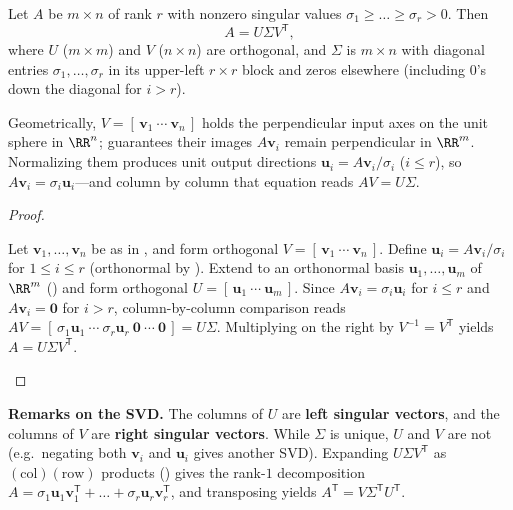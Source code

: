 \documentclass[10pt]{scrartcl}
\newcommand{\vv}[1]{\mathbf{#1}}
\begin{document}
\begin{theorem*}
  Let $A$ be $m\times n$ of rank $r$ with nonzero singular values $\sigma_1\ge\dots\ge\sigma_r>0$. Then
  \[
    A = U\Sigma V^{\mathsf T},
  \]
  where $U$ ($m\times m$) and $V$ ($n\times n$) are orthogonal, and $\Sigma$ is $m\times n$ with diagonal entries $\sigma_1,\dots,\sigma_r$ in its upper-left $r\times r$ block and zeros elsewhere (including $0$'s down the diagonal for $i>r$).
\end{theorem*}
\begin{ideabox}
  Geometrically, $V=[\,\vv v_1\ \cdots\ \vv v_n\,]$ holds the perpendicular input axes on the unit sphere in $\RR^n$;  guarantees their images $A\vv v_i$ remain perpendicular in $\RR^m$. Normalizing them produces unit output directions $\vv u_i=A\vv v_i/\sigma_i$ ($i\le r$), so $A\vv v_i=\sigma_i\vv u_i$---and column by column that equation reads $AV=U\Sigma$.
\end{ideabox}
\begin{proof}
  \begin{steps}
    \ii Let $\vv v_1,\dots,\vv v_n$ be as in , and form orthogonal $V=[\,\vv v_1\ \cdots\ \vv v_n\,]$.
    \ii Define $\vv u_i=A\vv v_i/\sigma_i$ for $1\le i\le r$ (orthonormal by ). Extend to an orthonormal basis $\vv u_1,\dots,\vv u_m$ of $\RR^m$ () and form orthogonal $U=[\,\vv u_1\ \cdots\ \vv u_m\,]$.
    \ii Since $A\vv v_i=\sigma_i\vv u_i$ for $i\le r$ and $A\vv v_i=\vv 0$ for $i>r$, column-by-column comparison reads $AV=[\,\sigma_1\vv u_1\ \cdots\ \sigma_r\vv u_r\ \vv 0\ \cdots\ \vv 0\,]=U\Sigma$. Multiplying on the right by $V^{-1}=V^{\mathsf T}$ yields $A=U\Sigma V^{\mathsf T}$. \qedhere
  \end{steps}
\end{proof}

\noindent\textbf{Remarks on the SVD.} The columns of $U$ are \textbf{left singular vectors}, and the columns of $V$ are \textbf{right singular vectors}. While $\Sigma$ is unique, $U$ and $V$ are not (e.g.\ negating both $\vv v_i$ and $\vv u_i$ gives another SVD). Expanding $U\Sigma V^{\mathsf T}$ as $(\text{col})(\text{row})$ products () gives the rank-$1$ decomposition $A=\sigma_1\vv u_1\vv v_1^{\mathsf T}+\dots+\sigma_r\vv u_r\vv v_r^{\mathsf T}$, and transposing yields $A^{\mathsf T}=V\Sigma^{\mathsf T}U^{\mathsf T}$.
\end{document}
